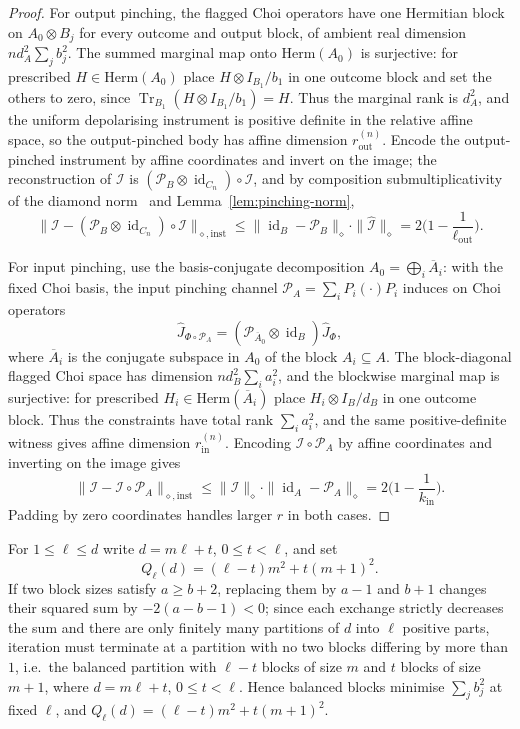 \documentclass[11pt,a4paper]{article}
\newcommand{\Herm}{\mathrm{Herm}}
\newcommand{\Tr}{\operatorname{Tr}}
\newcommand{\id}{\operatorname{id}}
\newcommand{\Jhat}{\widehat J}
\begin{document}
\begin{proof}
For output pinching, the flagged Choi operators have one Hermitian block on $A_0\otimes B_j$ for every outcome and output block, of ambient real dimension $nd_A^2\sum_jb_j^2$. The summed marginal map onto $\Herm(A_0)$ is surjective: for prescribed $H\in\Herm(A_0)$ place $H\otimes I_{B_1}/b_1$ in one outcome block and set the others to zero, since $\Tr_{B_1}(H\otimes I_{B_1}/b_1)=H$. Thus the marginal rank is $d_A^2$, and the uniform depolarising instrument is positive definite in the relative affine space, so the output-pinched body has affine dimension $r_{\mathrm{out}}^{(n)}$. Encode the output-pinched instrument by affine coordinates and invert on the image; the reconstruction of $\mathcal I$ is $(\mathcal P_B\otimes\id_{C_n})\circ\mathcal I$, and by composition submultiplicativity of the diamond norm~\cite{Watrous2018} and Lemma~\ref{lem:pinching-norm},
\[
\|\mathcal I-(\mathcal P_B\otimes\id_{C_n})\circ\mathcal I\|_{\diamond,\mathrm{inst}}
\le\|\id_B-\mathcal P_B\|_\diamond\cdot\|\widehat{\mathcal I}\|_\diamond
=2\Big(1-\frac1{\ell_{\mathrm{out}}}\Big).
\]

For input pinching, use the basis-conjugate decomposition $A_0=\bigoplus_i\overline A_i$: with the fixed Choi basis, the input pinching channel $\mathcal P_A=\sum_iP_i(\cdot)P_i$ induces on Choi operators
\[
\Jhat_{\Phi\circ\mathcal P_A}=(\mathcal P_{\overline A_0}\otimes\id_B)\Jhat_\Phi,
\]
where $\overline A_i$ is the conjugate subspace in $A_0$ of the block $A_i\subseteq A$. The block-diagonal flagged Choi space has dimension $nd_B^2\sum_ia_i^2$, and the blockwise marginal map is surjective: for prescribed $H_i\in\Herm(\overline A_i)$ place $H_i\otimes I_B/d_B$ in one outcome block. Thus the constraints have total rank $\sum_ia_i^2$, and the same positive-definite witness gives affine dimension $r_{\mathrm{in}}^{(n)}$. Encoding $\mathcal I\circ\mathcal P_A$ by affine coordinates and inverting on the image gives
\[
\|\mathcal I-\mathcal I\circ\mathcal P_A\|_{\diamond,\mathrm{inst}}
\le\|\widehat{\mathcal I}\|_\diamond\cdot\|\id_A-\mathcal P_A\|_\diamond
=2\Big(1-\frac1{k_{\mathrm{in}}}\Big).
\]
Padding by zero coordinates handles larger $r$ in both cases.
\end{proof}

For $1\le\ell\le d$ write $d=m\ell+t$, $0\le t<\ell$, and set
\[
Q_\ell(d)=(\ell-t)m^2+t(m+1)^2.
\]
If two block sizes satisfy $a\ge b+2$, replacing them by $a-1$ and $b+1$ changes their squared sum by $-2(a-b-1)<0$; since each exchange strictly decreases the sum and there are only finitely many partitions of $d$ into $\ell$ positive parts, iteration must terminate at a partition with no two blocks differing by more than $1$, i.e.\ the balanced partition with $\ell-t$ blocks of size $m$ and $t$ blocks of size $m+1$, where $d=m\ell+t$, $0\le t<\ell$. Hence balanced blocks minimise $\sum_jb_j^2$ at fixed $\ell$, and $Q_\ell(d)=(\ell-t)m^2+t(m+1)^2$.
\end{document}
